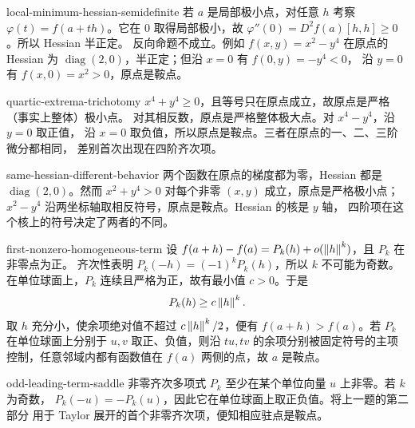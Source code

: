 \begin{solution}{local-minimum-hessian-semidefinite}
若 $a$ 是局部极小点，对任意 $h$ 考察
$\varphi(t)=f(a+th)$。它在 $0$ 取得局部极小，故
$\varphi''(0)=D^2f(a)[h,h]\ge0$。所以 Hessian 半正定。
反向命题不成立。例如 $f(x,y)=x^2-y^4$ 在原点的 Hessian 为
$\operatorname{diag}(2,0)$，半正定；但沿 $x=0$ 有 $f(0,y)=-y^4<0$，
沿 $y=0$ 有 $f(x,0)=x^2>0$，原点是鞍点。
\end{solution}

\begin{solution}{quartic-extrema-trichotomy}
$x^4+y^4\ge0$，且等号只在原点成立，故原点是严格（事实上整体）极小点。
对其相反数，原点是严格整体极大点。对 $x^4-y^4$，沿 $y=0$ 取正值，
沿 $x=0$ 取负值，所以原点是鞍点。三者在原点的一、二、三阶微分都相同，
差别首次出现在四阶齐次项。
\end{solution}

\begin{solution}{same-hessian-different-behavior}
两个函数在原点的梯度都为零，Hessian 都是
$\operatorname{diag}(2,0)$。然而
$x^2+y^4>0$ 对每个非零 $(x,y)$ 成立，原点是严格极小点；
$x^2-y^4$ 沿两坐标轴取相反符号，原点是鞍点。Hessian 的核是 $y$ 轴，
四阶项在这个核上的符号决定了两者的不同。
\end{solution}

\begin{solution}{first-nonzero-homogeneous-term}
设
$f(a+h)-f(a)=P_k(h)+o(\left\lVert h\right\rVert^k)$，且 $P_k$ 在非零点为正。
齐次性表明 $P_k(-h)=(-1)^kP_k(h)$，所以 $k$ 不可能为奇数。
在单位球面上，$P_k$ 连续且严格为正，故有最小值 $c>0$。于是
\[
 P_k(h)\ge c\left\lVert h\right\rVert^k.
\]
取 $h$ 充分小，使余项绝对值不超过 $c\left\lVert h\right\rVert^k/2$，便有
$f(a+h)>f(a)$。若 $P_k$ 在单位球面上分别于 $u,v$ 取正、负值，则沿
$tu,tv$ 的余项分别被固定符号的主项控制，任意邻域内都有函数值在
$f(a)$ 两侧的点，故 $a$ 是鞍点。
\end{solution}

\begin{solution}{odd-leading-term-saddle}
非零齐次多项式 $P_k$ 至少在某个单位向量 $u$ 上非零。若 $k$ 为奇数，
$P_k(-u)=-P_k(u)$，因此它在单位球面上取正负值。将上一题的第二部分
用于 Taylor 展开的首个非零齐次项，便知相应驻点是鞍点。
\end{solution}

